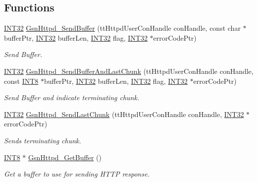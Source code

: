 \subsection*{Functions}
\begin{DoxyCompactItemize}
\item 
\hyperlink{a00660_ga63021d67d54286c2163bcdb43a6f2569}{INT32} \hyperlink{a00666_ga95afa0c13f59a7b224e60c11a051a45a}{GsnHttpd\_\-SendBuffer} (ttHttpdUserConHandle conHandle, const char $\ast$bufferPtr, \hyperlink{a00660_ga63021d67d54286c2163bcdb43a6f2569}{INT32} bufferLen, \hyperlink{a00660_ga63021d67d54286c2163bcdb43a6f2569}{INT32} flag, \hyperlink{a00660_ga63021d67d54286c2163bcdb43a6f2569}{INT32} $\ast$errorCodePtr)
\begin{DoxyCompactList}\small\item\em Send Buffer. \end{DoxyCompactList}\item 
\hyperlink{a00660_ga63021d67d54286c2163bcdb43a6f2569}{INT32} \hyperlink{a00666_ga9e05db18fe9e554159a3fe594492687d}{GsnHttpd\_\-SendBufferAndLastChunk} (ttHttpdUserConHandle conHandle, const \hyperlink{a00660_ga307b8734c020247f6bac4fcde0dcfbb9}{INT8} $\ast$bufferPtr, \hyperlink{a00660_ga63021d67d54286c2163bcdb43a6f2569}{INT32} bufferLen, \hyperlink{a00660_ga63021d67d54286c2163bcdb43a6f2569}{INT32} flag, \hyperlink{a00660_ga63021d67d54286c2163bcdb43a6f2569}{INT32} $\ast$errorCodePtr)
\begin{DoxyCompactList}\small\item\em Send Buffer and indicate terminating chunk. \end{DoxyCompactList}\item 
\hyperlink{a00660_ga63021d67d54286c2163bcdb43a6f2569}{INT32} \hyperlink{a00666_ga04f2afbebcac5ab376d70b735803d69d}{GsnHttpd\_\-SendLastChunk} (ttHttpdUserConHandle conHandle, \hyperlink{a00660_ga63021d67d54286c2163bcdb43a6f2569}{INT32} $\ast$errorCodePtr)
\begin{DoxyCompactList}\small\item\em Sends terminating chunk. \end{DoxyCompactList}\item 
\hyperlink{a00660_ga307b8734c020247f6bac4fcde0dcfbb9}{INT8} $\ast$ \hyperlink{a00666_ga38a6f342aa4579945c64f4809c5feb20}{GsnHttpd\_\-GetBuffer} ()
\begin{DoxyCompactList}\small\item\em Get a buffer to use for sending HTTP response. \end{DoxyCompactList}\item 

\end{DoxyCompactItemize}
